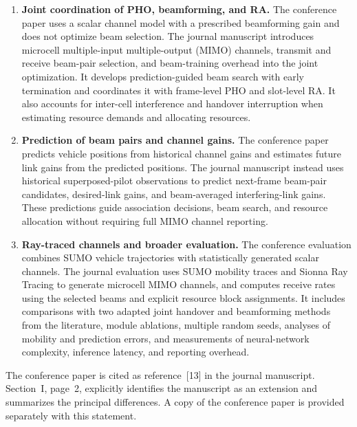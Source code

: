 \documentclass[11pt,a4paper]{article}
\begin{document}
\begin{enumerate}[leftmargin=*,itemsep=0.55em,parsep=0pt,topsep=0.2em]
  \item \textbf{Joint coordination of PHO, beamforming, and RA.}
  The conference paper uses a scalar channel model with a prescribed beamforming
  gain and does not optimize beam selection. The journal manuscript introduces
  microcell multiple-input multiple-output (MIMO) channels, transmit and receive
  beam-pair selection, and beam-training overhead into the joint optimization.
  It develops prediction-guided beam search with early termination and coordinates
  it with frame-level PHO and slot-level RA. It also accounts for inter-cell
  interference and handover interruption when estimating resource demands and allocating
  resources.

  \item \textbf{Prediction of beam pairs and channel gains.}
  The conference paper predicts vehicle positions from historical channel gains
  and estimates future link gains from the predicted positions. The journal
  manuscript instead uses historical superposed-pilot observations to predict
  next-frame beam-pair candidates, desired-link gains, and beam-averaged
  interfering-link gains. These predictions guide association decisions, beam
  search, and resource allocation without requiring full MIMO channel reporting.

  \item \textbf{Ray-traced channels and broader evaluation.}
  The conference evaluation combines SUMO vehicle trajectories with statistically
  generated scalar channels. The journal evaluation uses SUMO mobility traces and
  Sionna Ray Tracing to generate microcell MIMO channels, and computes receive
  rates using the selected beams and explicit resource block assignments. It
  includes comparisons with two adapted joint handover and beamforming methods from
  the literature, module ablations, multiple random seeds, analyses of mobility
  and prediction errors, and measurements of neural-network complexity,
  inference latency, and reporting overhead.
\end{enumerate}

The conference paper is cited as reference~[13] in the journal manuscript.
Section~I, page~2, explicitly identifies the manuscript as an extension and
summarizes the principal differences. A copy of the conference paper is provided
separately with this statement.
\end{document}
